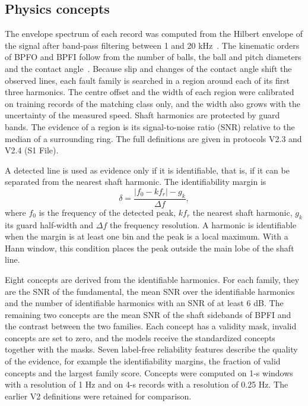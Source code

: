 \documentclass[10pt,letterpaper]{article}
\begin{document}
\subsection*{Physics concepts}
The envelope spectrum of each record was computed from the Hilbert envelope of the signal after band-pass filtering between 1 and 20 kHz~\cite{randall2011rolling,ho2000optimisation}. The kinematic orders of BPFO and BPFI follow from the number of balls, the ball and pitch diameters and the contact angle~\cite{randall2011rolling}. Because slip and changes of the contact angle shift the observed lines, each fault family is searched in a region around each of its first three harmonics. The centre offset and the width of each region were calibrated on training records of the matching class only, and the width also grows with the uncertainty of the measured speed. Shaft harmonics are protected by guard bands. The evidence of a region is its signal-to-noise ratio (SNR) relative to the median of a surrounding ring. The full definitions are given in protocols V2.3 and V2.4 (S1 File).

A detected line is used as evidence only if it is identifiable, that is, if it can be separated from the nearest shaft harmonic. The identifiability margin is
\begin{equation}
\delta = \frac{\lvert f_0 - k f_r \rvert - g_k}{\Delta f},
\label{eq:ident}
\end{equation}
where $f_0$ is the frequency of the detected peak, $k f_r$ the nearest shaft harmonic, $g_k$ its guard half-width and $\Delta f$ the frequency resolution. A harmonic is identifiable when the margin is at least one bin and the peak is a local maximum. With a Hann window, this condition places the peak outside the main lobe of the shaft line.

Eight concepts are derived from the identifiable harmonics. For each family, they are the SNR of the fundamental, the mean SNR over the identifiable harmonics and the number of identifiable harmonics with an SNR of at least 6 dB. The remaining two concepts are the mean SNR of the shaft sidebands of BPFI and the contrast between the two families. Each concept has a validity mask, invalid concepts are set to zero, and the models receive the standardized concepts together with the masks. Seven label-free reliability features describe the quality of the evidence, for example the identifiability margins, the fraction of valid concepts and the largest family score. Concepts were computed on 1-s windows with a resolution of 1 Hz and on 4-s records with a resolution of 0.25 Hz. The earlier V2 definitions were retained for comparison.
\end{document}
